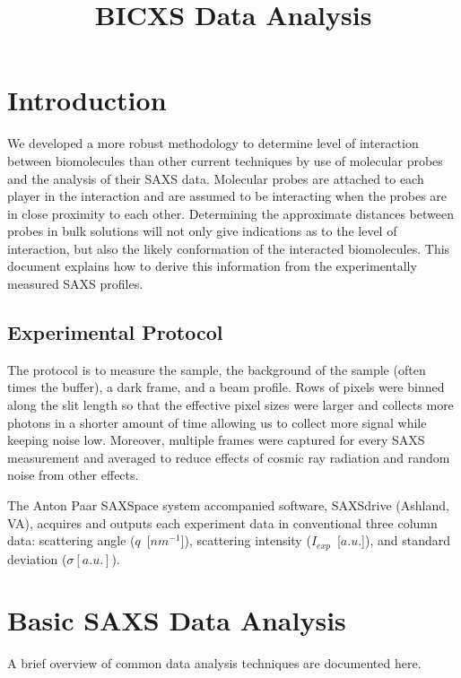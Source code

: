 \documentclass[10pt]{article}%
\begin{document}
\title{BICXS Data Analysis}
\maketitle

\tableofcontents 

\section{Introduction}
We developed a more robust methodology to determine level of interaction between biomolecules than other current techniques by use of molecular probes and the analysis of their SAXS data. Molecular probes are attached to each player in the interaction and are assumed to be interacting when the probes are in close proximity to each other. Determining the approximate distances between probes in bulk solutions will not only give indications as to the level of interaction, but also the likely conformation of the interacted biomolecules. This document explains how to derive this information from the experimentally measured SAXS profiles.

\subsection{Experimental Protocol}
The protocol is to measure the sample, the background of the sample (often times the buffer), a dark frame, and a beam profile. Rows of pixels were binned along the slit length so that the effective pixel sizes were larger and collects more photons in a shorter amount of time allowing us to collect more signal while keeping noise low. Moreover, multiple frames were captured for every SAXS measurement and averaged to reduce effects of cosmic ray radiation and random noise from other effects.

 
The Anton Paar SAXSpace system accompanied software, SAXSdrive (Ashland, VA), acquires and outputs each experiment data in  conventional three column data: scattering angle ($q$~[$nm^{-1}$]), scattering intensity ($I_{exp}$~[$a.u.$]), and standard deviation ($\sigma [a.u.]$). 

\section{Basic SAXS Data Analysis}
A brief overview of common data analysis techniques are documented here. 
\end{document}
